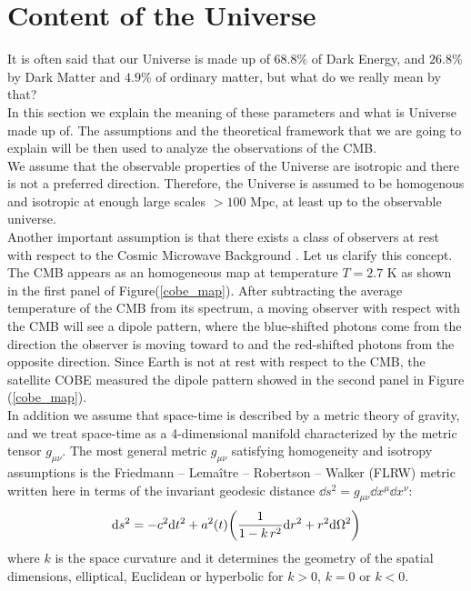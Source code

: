 \documentclass{article}
\begin{document}
\newpage


\section{Content of the Universe} 
It is often said that our Universe is made up of $68.8$\% of Dark Energy, and $26.8 $\% by Dark Matter and $4.9 $\% of ordinary matter, but what do we really mean by that?\\
In this section we explain the meaning of these parameters and what is Universe made up of. 
The assumptions and the theoretical framework that we are going to explain will be then used to analyze the observations of the CMB.\\
We assume that the observable properties of the Universe are isotropic and there is not a preferred direction. 
Therefore, the Universe is assumed to be homogenous and isotropic at enough large scales $> 100$ Mpc, at least up to the observable universe.\\
Another important assumption is that there exists a class of observers at rest with respect to the Cosmic Microwave Background \citep{bartelmannStandardModelCosmology}.
Let us clarify this concept.
The CMB appears as an homogeneous map at temperature $T=2.7$ K as shown in the first panel of Figure(\ref{cobe_map}).
After subtracting the average temperature of the CMB from its spectrum, a moving observer with respect with the CMB will see a dipole pattern, where the blue-shifted photons come from the direction the observer is moving toward to and the red-shifted photons from the opposite direction.
Since Earth is not at rest with respect to the CMB, the satellite COBE measured the dipole pattern showed in the second panel in Figure (\ref{cobe_map}).\\
In addition we assume that space-time is described by a metric theory of gravity, and we treat space-time as a 4-dimensional manifold characterized by the metric tensor $g_{\mu \nu}$.
The most general metric $g_{\mu \nu}$ satisfying homogeneity and isotropy assumptions is the Friedmann – Lemaître – Robertson – Walker (FLRW) metric written here in terms of the invariant geodesic distance $\dd s ^2 = g_{\mu \nu} \dd x^{\mu} \dd x^{\nu}$:
\begin{equation}
\label{metric}
\dd s ^2 = -c ^2 \dd t^2 + a^2 (t) \qty( \frac{1}{1-k \, r^2} \dd r^2 + r^2 \dd \Omega ^2 )  
\end{equation}
where $k$ is the space curvature and it determines the geometry of the spatial dimensions, elliptical, Euclidean or hyperbolic for $k>0$, $k=0$ or $k<0$.
\end{document}
